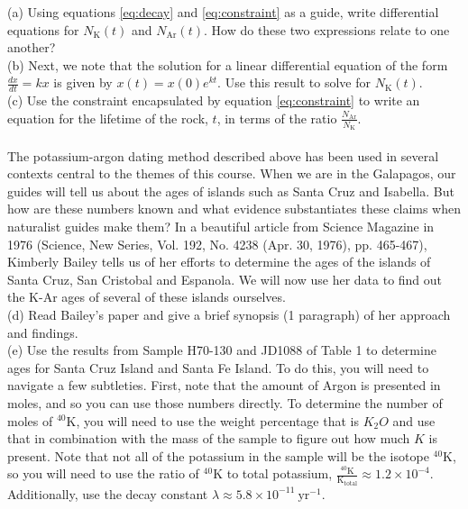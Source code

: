\documentclass[12pt]{article}    %
\begin{document}
(a) Using equations \ref{eq:decay} and \ref{eq:constraint} as a guide, write differential equations for $N_\mathrm{K}(t)$ and $N_\mathrm{Ar}(t)$. How do these two expressions relate to one another?\\


(b)  Next, we note that the solution for a linear differential equation of the form $\frac{dx}{dt} = kx$ is given by $x(t) = x(0) e^{kt}$. Use this result to solve for $N_\mathrm{K}(t)$.\\


(c) Use the constraint encapsulated by equation \ref{eq:constraint} to write an equation for the lifetime of the rock, $t$, in terms of the ratio $\frac{N_\mathrm{Ar}}{N_\mathrm{K}}$.\\



\\

The potassium-argon dating method described above has been used in
several contexts central to the themes of this course.  When we are in
the Galapagos, our guides will tell us about the ages of islands such
as Santa Cruz and Isabella.  But how are these numbers known
and what evidence substantiates these claims when naturalist guides make
them?  In a beautiful article from Science Magazine in 1976 (Science, New Series, Vol. 192, No. 4238 (Apr. 30, 1976), pp. 465-467), Kimberly Bailey tells us of her efforts to determine the ages of the islands of
Santa Cruz, San Cristobal and Espanola.  We will now
use her data to find out the K-Ar ages of several of these islands ourselves. \\

(d) Read Bailey's paper and give a brief synopsis (1 paragraph) of her approach
and findings.\\

(e)  Use
the results from Sample H70-130 and JD1088 of Table 1 to determine ages for Santa Cruz Island and
Santa Fe Island.   To
do this, you will need to navigate a few subtleties.  First, note that the amount of Argon is
presented in moles, and so you can use those numbers directly.   To determine
the number of moles of $^{40}\mathrm{K}$, you will need to use the weight percentage that is $K_2O$ and use that in combination with the mass of the sample to figure out how much $K$ is present.   Note that not all of the potassium in the sample will be the isotope $^{40}\mathrm{K}$, so you will need to use the ratio of $^{40}\mathrm{K}$ to total potassium, $\mathrm{\frac{^{40}K}{K_{total}}} \approx 1.2 \times 10^{-4}$. Additionally, use the decay constant $\lambda \approx 5.8 \times 10^{-11}\ \mathrm{yr}^{-1}$.\\
\end{document}
